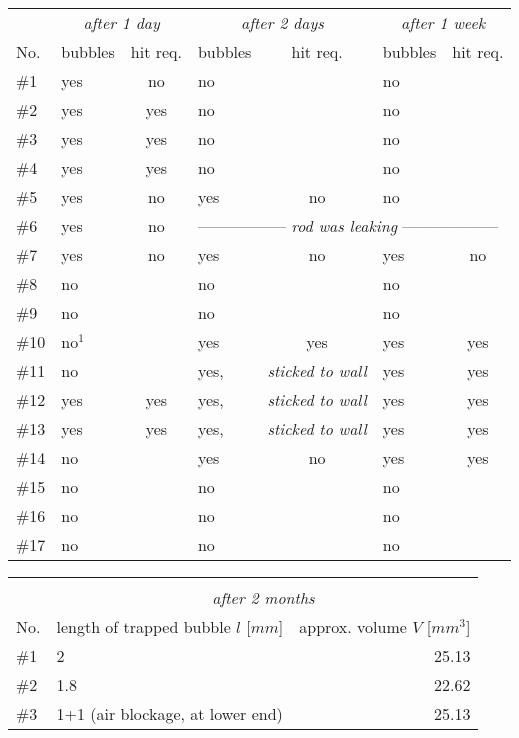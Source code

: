 \begin{table}[]
\centering
\begin{tabular}{l|lc|lc|lc}
    & \multicolumn{2}{c}{\textit{after 1 day}} 	& \multicolumn{2}{c}{\textit{after 2 days}}	& \multicolumn{2}{c}{\textit{after 1 week}}	\\ 
No. & bubbles	& hit req.	& bubbles 	& hit req.	& bubbles 	& hit req.	\\
\toprule
\#1   & yes	& no		& no		&		& no		&		\\
\#2   & yes	& yes		& no		&		& no		&		\\
\#3   & yes	& yes		& no		&		& no		&		\\
\#4   & yes	& yes		& no		&		& no		&		\\
\#5   & yes	& no		& yes		& no		& no		&		\\
\#6   & yes	& no		& \multicolumn{4}{l}{-----------------\textit{ rod was leaking }------------------}	\\
\#7   & yes	& no		& yes		& no		& yes		& no		\\
\#8   & no	&		& no		&		& no		&		\\
\#9   & no	&		& no		&		& no		&		\\
\#10  & no$^1$	&		& yes		& yes		& yes		& yes		\\
\#11  & no	&		& yes,		& \textit{sticked to wall} &	 yes	& yes\\
\#12  & yes	& yes		& yes,		& \textit{sticked to wall} &	 yes	& yes\\
\#13  & yes	& yes		& yes,		& \textit{sticked to wall} &	 yes	& yes\\
\#14  & no	&   		& yes		& no		& yes		& yes		\\
\#15  & no	&   		& no		&		& no		&		\\
\#16  & no	&   		& no		&		& no		&		\\
\#17  & no	&   		& no		&		& no		&		\\
\bottomrule
\end{tabular}
\begin{tabular}{l|lr}
\multicolumn{3}{c}{}								\\
& \multicolumn{2}{c}{\textit{after 2 months}}					\\ 
No. & length of trapped bubble $l$ [$mm$] 	& approx. volume $V$ [$mm^3$]	\\
\toprule
\#1   & 2					& 25.13				\\
\#2   & 1.8					& 22.62				\\
\#3   & 1+1 (air blockage, at lower end)	& 25.13				\\

\end{tabular}
\end{table}

